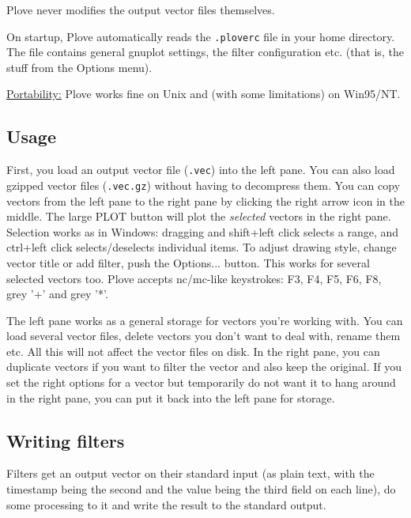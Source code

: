 Plove never modifies the output vector files themselves.

On startup, Plove automatically reads the \texttt{.ploverc} file in
your home directory. The file contains general gnuplot settings, the
filter configuration etc.  (that is, the stuff from the Options menu).


{\underline {Portability:}} Plove works fine on Unix and (with some
limitations) on Win95/NT.





\subsection{Usage}

First, you load an output vector file (\texttt{.vec}) into the left
pane.  You can also load gzipped vector files (\texttt{.vec.gz})
without having to decompress them. You can copy vectors from the left
pane to the right pane by clicking the right arrow icon in the middle.
The large PLOT button will plot the \textit{selected} vectors in the
right pane. Selection works as in Windows: dragging and shift+left
click selects a range, and ctrl+left click selects/deselects
individual items. To adjust drawing style, change vector title or add
filter, push the Options... button. This works for several selected
vectors too. Plove accepts nc/mc-like keystrokes: F3, F4, F5, F6, F8,
grey '+' and grey '*'.


The left pane works as a general storage for vectors you're working
with. You can load several vector files, delete vectors you don't
want to deal with, rename them etc. All this will not affect
the vector files on disk. In the right pane, you can duplicate
vectors if you want to filter the vector and also keep the original.
If you set the right options for a vector but temporarily do
not want it to hang around in the right pane, you can put it
back into the left pane for storage.





\subsection{Writing filters}

Filters get an output vector on their standard input (as plain
text, with the timestamp being the second and the value being
the third field on each line), do some processing to it and write
the result to the standard output.


